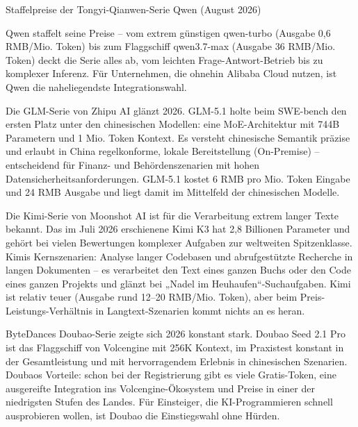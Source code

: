 \begin{center}\small\color{gray}Staffelpreise der Tongyi-Qianwen-Serie Qwen (August 2026)\end{center}

Qwen staffelt seine Preise – vom extrem günstigen qwen-turbo (Ausgabe 0,6 RMB/Mio. Token) bis zum Flaggschiff qwen3.7-max (Ausgabe 36 RMB/Mio. Token) deckt die Serie alles ab, vom leichten Frage-Antwort-Betrieb bis zu komplexer Inferenz. Für Unternehmen, die ohnehin Alibaba Cloud nutzen, ist Qwen die naheliegendste Integrationswahl.


Die GLM-Serie von Zhipu AI glänzt 2026. GLM-5.1 holte beim SWE-bench den ersten Platz unter den chinesischen Modellen: eine MoE-Architektur mit 744B Parametern und 1 Mio. Token Kontext. Es versteht chinesische Semantik präzise und erlaubt in China regelkonforme, lokale Bereitstellung (On-Premise) – entscheidend für Finanz- und Behördenszenarien mit hohen Datensicherheitsanforderungen. GLM-5.1 kostet 6 RMB pro Mio. Token Eingabe und 24 RMB Ausgabe und liegt damit im Mittelfeld der chinesischen Modelle.


Die Kimi-Serie von Moonshot AI ist für die Verarbeitung extrem langer Texte bekannt. Das im Juli 2026 erschienene Kimi K3 hat 2,8 Billionen Parameter und gehört bei vielen Bewertungen komplexer Aufgaben zur weltweiten Spitzenklasse. Kimis Kernszenarien: Analyse langer Codebasen und abrufgestützte Recherche in langen Dokumenten – es verarbeitet den Text eines ganzen Buchs oder den Code eines ganzen Projekts und glänzt bei „Nadel im Heuhaufen“-Suchaufgaben. Kimi ist relativ teuer (Ausgabe rund 12–20 RMB/Mio. Token), aber beim Preis-Leistungs-Verhältnis in Langtext-Szenarien kommt nichts an es heran.


ByteDances Doubao-Serie zeigte sich 2026 konstant stark. Doubao Seed 2.1 Pro ist das Flaggschiff von Volcengine mit 256K Kontext, im Praxistest konstant in der Gesamtleistung und mit hervorragendem Erlebnis in chinesischen Szenarien. Doubaos Vorteile: schon bei der Registrierung gibt es viele Gratis-Token, eine ausgereifte Integration ins Volcengine-Ökosystem und Preise in einer der niedrigsten Stufen des Landes. Für Einsteiger, die KI-Programmieren schnell ausprobieren wollen, ist Doubao die Einstiegswahl ohne Hürden.

